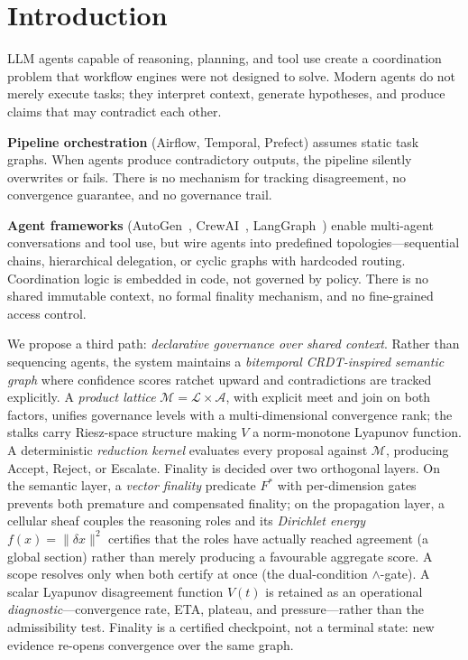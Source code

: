\documentclass[11pt]{article}
\begin{document}
\section{Introduction}
\label{sec:introduction}

LLM agents capable of reasoning, planning, and tool use create a coordination problem that workflow engines were not designed to solve.
Modern agents do not merely execute tasks; they interpret context, generate hypotheses, and produce claims that may contradict each other.

\textbf{Pipeline orchestration} (Airflow, Temporal, Prefect) assumes static task graphs.
When agents produce contradictory outputs, the pipeline silently overwrites or fails.
There is no mechanism for tracking disagreement, no convergence guarantee, and no governance trail.

\textbf{Agent frameworks} (AutoGen~\cite{wu2023autogen}, CrewAI~\cite{crewai2024}, LangGraph~\cite{langgraph2024}) enable multi-agent conversations and tool use, but wire agents into predefined topologies---sequential chains, hierarchical delegation, or cyclic graphs with hardcoded routing.
Coordination logic is embedded in code, not governed by policy.
There is no shared immutable context, no formal finality mechanism, and no fine-grained access control.

We propose a third path: \emph{declarative governance over shared context}.
Rather than sequencing agents, the system maintains a \emph{bitemporal CRDT-inspired semantic graph} where confidence scores ratchet upward and contradictions are tracked explicitly.
A \emph{product lattice} $\mathcal{M} = \mathcal{L} \times \mathcal{A}$, with explicit meet and join on both factors, unifies governance levels with a multi-dimensional convergence rank; the stalks carry Riesz-space structure making $V$ a norm-monotone Lyapunov function.
A deterministic \emph{reduction kernel} evaluates every proposal against $\mathcal{M}$, producing Accept, Reject, or Escalate.
Finality is decided over two orthogonal layers. On the semantic layer, a \emph{vector finality} predicate $F^*$ with per-dimension gates prevents both premature and compensated finality; on the propagation layer, a cellular sheaf couples the reasoning roles and its \emph{Dirichlet energy} $f(x) = \|\delta x\|^2$ certifies that the roles have actually reached agreement (a global section) rather than merely producing a favourable aggregate score. A scope resolves only when both certify at once (the dual-condition $\wedge$-gate). A scalar Lyapunov disagreement function $V(t)$ is retained as an operational \emph{diagnostic}---convergence rate, ETA, plateau, and pressure---rather than the admissibility test.
Finality is a certified checkpoint, not a terminal state: new evidence re-opens convergence over the same graph.
\end{document}
